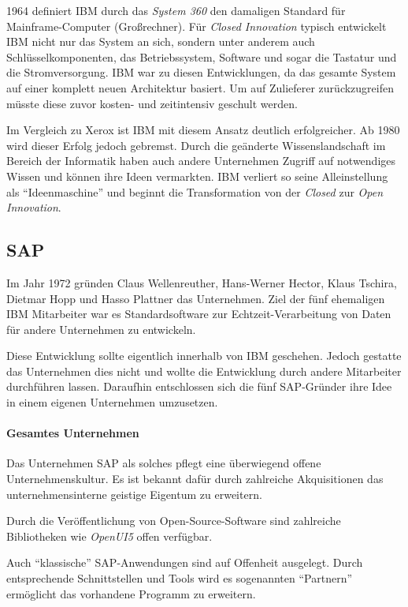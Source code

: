 1964 definiert IBM durch das \textit{System 360} den damaligen Standard für Mainframe-Computer (Großrechner).
Für \textit{Closed Innovation} typisch entwickelt IBM nicht nur das System an sich,
sondern unter anderem auch Schlüsselkomponenten, das Betriebssystem, Software und sogar die Tastatur und die Stromversorgung.
IBM war zu diesen Entwicklungen, da das gesamte System auf einer komplett neuen Architektur basiert.
Um auf Zulieferer zurückzugreifen müsste diese zuvor kosten- und zeitintensiv geschult werden.

Im Vergleich zu Xerox ist IBM mit diesem Ansatz deutlich erfolgreicher.
Ab 1980 wird dieser Erfolg jedoch gebremst.
Durch die geänderte Wissenslandschaft im Bereich der Informatik haben auch andere Unternehmen
Zugriff auf notwendiges Wissen und können ihre Ideen vermarkten.
IBM verliert so seine Alleinstellung als \enquote{Ideenmaschine}
und beginnt die Transformation von der \textit{Closed} zur \textit{Open Innovation}.


\subsection{SAP}\label{sec:beispiele-sap}
Im Jahr 1972 gründen Claus Wellenreuther, Hans-Werner Hector, Klaus Tschira, Dietmar Hopp und Hasso Plattner das Unternehmen.
Ziel der fünf ehemaligen IBM Mitarbeiter war es
Standardsoftware zur Echtzeit-\linebreak{}Verarbeitung von Daten für andere Unternehmen zu entwickeln.

Diese Entwicklung sollte eigentlich innerhalb von IBM geschehen.
Jedoch gestatte das Unternehmen dies nicht und wollte die Entwicklung durch andere Mitarbeiter durchführen lassen.
Daraufhin entschlossen sich die fünf SAP-Gründer ihre Idee in einem eigenen Unternehmen umzusetzen. \cite{SAPCompa72:online}

\paragraph{Gesamtes Unternehmen}\label{sec:beispiele-sap-gesamt}
Das Unternehmen SAP als solches pflegt eine überwiegend offene Unternehmenskultur.
Es ist bekannt dafür durch zahlreiche Akquisitionen das unternehmensinterne geistige Eigentum zu erweitern.

Durch die Veröffentlichung von Open-Source-Software sind zahlreiche Bibliotheken wie \textit{OpenUI5} offen verfügbar.

Auch \enquote{klassische} SAP-Anwendungen sind auf Offenheit ausgelegt.
Durch entsprechende Schnittstellen und Tools wird es sogenannten \enquote{Partnern}
ermöglicht das vorhandene Programm zu erweitern.

